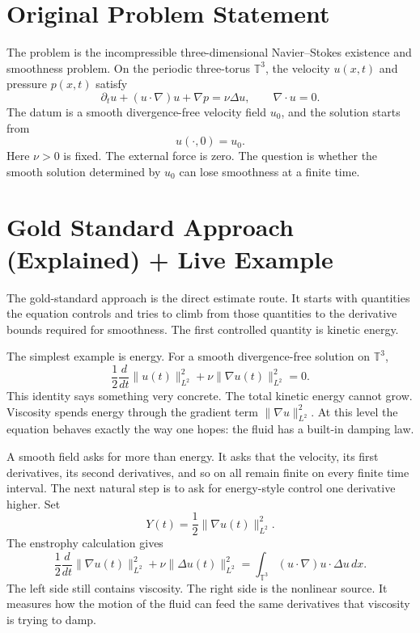 \documentclass[11pt]{article}
\begin{document}
\setcounter{tocdepth}{1}
\tableofcontents
\clearpage

\section{Original Problem Statement}

The problem is the incompressible three-dimensional Navier--Stokes existence and smoothness problem.
On the periodic three-torus \(\mathbb T^3\), the velocity \(u(x,t)\) and pressure \(p(x,t)\) satisfy
\[
  \partial_t u +(u\cdot\nabla)u+\nabla p=\nu\Delta u,
  \qquad
  \nabla\cdot u=0.
\]
The datum is a smooth divergence-free velocity field \(u_0\), and the solution starts from
\[
  u(\cdot,0)=u_0.
\]
Here \(\nu>0\) is fixed.
The external force is zero.
The question is whether the smooth solution determined by \(u_0\) can lose smoothness at a finite time.

\section{Gold Standard Approach (Explained) + Live Example}

The gold-standard approach is the direct estimate route.
It starts with quantities the equation controls and tries to climb from those quantities to the derivative bounds required for smoothness.
The first controlled quantity is kinetic energy.

The simplest example is energy.
For a smooth divergence-free solution on \(\mathbb T^3\),
\[
  \frac12\frac{d}{dt}\|u(t)\|_{L^2}^2
  +\nu\|\nabla u(t)\|_{L^2}^2=0.
\]
This identity says something very concrete.
The total kinetic energy cannot grow.
Viscosity spends energy through the gradient term \(\|\nabla u\|_{L^2}^2\).
At this level the equation behaves exactly the way one hopes: the fluid has a built-in damping law.

A smooth field asks for more than energy.
It asks that the velocity, its first derivatives, its second derivatives, and so on all remain finite on every finite time interval.
The next natural step is to ask for energy-style control one derivative higher.
Set
\[
  Y(t)=\frac12\|\nabla u(t)\|_{L^2}^2.
\]
The enstrophy calculation gives
\[
  \frac12\frac{d}{dt}\|\nabla u(t)\|_{L^2}^2
  +\nu\|\Delta u(t)\|_{L^2}^2
  =
  \int_{\mathbb T^3}(u\cdot\nabla)u\cdot\Delta u\,dx.
\]
The left side still contains viscosity.
The right side is the nonlinear source.
It measures how the motion of the fluid can feed the same derivatives that viscosity is trying to damp.
\end{document}
